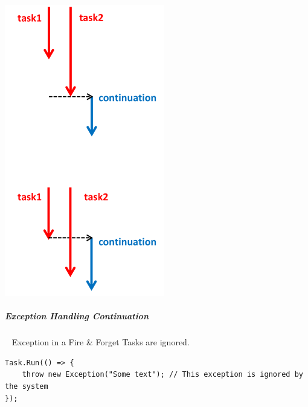 \documentclass[11pt,twoside,landscape]{article}
\begin{document}
\begin{multicols}{3}
{{{
\begin{center}
\includegraphics[width=.9\linewidth]{img/task_multi_continuation.png}
\end{center}
\label{fig:multi-continuation}
}

\subparagraph{Exception Handling Continuation} \
\label{sec:orgb53291a}
Exception in a Fire \& Forget Tasks are ignored.

\lstset{language=csharp,label= ,caption= ,captionpos=b,numbers=none}
\begin{lstlisting}
Task.Run(() => {
    throw new Exception("Some text"); // This exception is ignored by the system
});
\end{lstlisting}

}}
\end{multicols}
\end{document}
